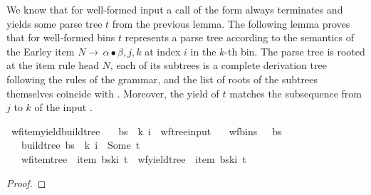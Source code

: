 \begin{isabellebody}
%
\isadelimdocument
%
\endisadelimdocument
%
\isatagdocument
%
\isamarkuptrue%
%
\endisatagdocument
{\isafolddocument}%
%
\isadelimdocument
%
\endisadelimdocument
%
\begin{isamarkuptext}%
We know that for well-formed input a call of the form  always terminates
and yields some parse tree $t$ from the previous lemma. The following lemma proves that for well-formed bins
$t$ represents a parse tree according to the semantics of the Earley item $N \rightarrow \, \alpha \bullet \beta, j, k$
at index $i$ in the $k$-th bin. The parse tree is rooted at the item rule head $N$, each of its subtrees is a complete derivation
tree following the rules of the grammar, and the list of roots of the subtrees themselves coincide with
\isa{{\isasymalpha}}. Moreover, the yield of $t$ matches the subsequence from $j$ to $k$ of the input \isa{{\isasymomega}}.%
\end{isamarkuptext}\isamarkuptrue%
\isamarkupfalse%
\ wf{\isacharunderscore}{\kern0pt}item{\isacharunderscore}{\kern0pt}yield{\isacharunderscore}{\kern0pt}build{\isacharunderscore}{\kern0pt}tree{\isacharprime}{\kern0pt}{\isacharcolon}{\kern0pt}\isanewline
\ \ \ {\isachardoublequoteopen}{\isacharparenleft}{\kern0pt}bs{\isacharcomma}{\kern0pt}\ {\isasymomega}{\isacharcomma}{\kern0pt}\ k{\isacharcomma}{\kern0pt}\ i{\isacharparenright}{\kern0pt}\ {\isasymin}\ wf{\isacharunderscore}{\kern0pt}tree{\isacharunderscore}{\kern0pt}input{\isachardoublequoteclose}\isanewline
\ \ \ {\isachardoublequoteopen}wf{\isacharunderscore}{\kern0pt}bins\ {\isasymG}\ {\isasymomega}\ bs{\isachardoublequoteclose}\isanewline
\ \ \ {\isachardoublequoteopen}build{\isacharunderscore}{\kern0pt}tree{\isacharprime}{\kern0pt}\ bs\ {\isasymomega}\ k\ i\ {\isacharequal}{\kern0pt}\ Some\ t{\isachardoublequoteclose}\isanewline
\ \ \ {\isachardoublequoteopen}wf{\isacharunderscore}{\kern0pt}item{\isacharunderscore}{\kern0pt}tree\ {\isasymG}\ {\isacharparenleft}{\kern0pt}item\ {\isacharparenleft}{\kern0pt}bs{\isacharbang}{\kern0pt}k{\isacharbang}{\kern0pt}i{\isacharparenright}{\kern0pt}{\isacharparenright}{\kern0pt}\ t\ {\isasymand}\ wf{\isacharunderscore}{\kern0pt}yield{\isacharunderscore}{\kern0pt}tree\ {\isasymomega}\ {\isacharparenleft}{\kern0pt}item\ {\isacharparenleft}{\kern0pt}bs{\isacharbang}{\kern0pt}k{\isacharbang}{\kern0pt}i{\isacharparenright}{\kern0pt}{\isacharparenright}{\kern0pt}\ t{\isachardoublequoteclose}%
\isadelimproof
%
\endisadelimproof
%
\isatagproof
%
\endisatagproof
{\isafoldproof}%
%
\isadelimproof
%
\endisadelimproof
%
\begin{isamarkuptext}%
\begin{proof}


\end{proof}
\end{isamarkuptext}
\end{isabellebody}
